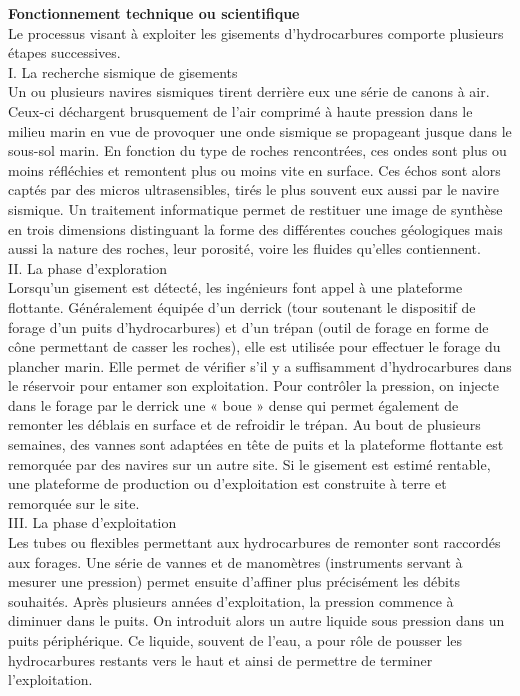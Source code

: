 \documentclass[8pt]{article}
\begin{document}
\textbf{Fonctionnement technique ou scientifique}\\

Le processus visant à exploiter les gisements d’hydrocarbures comporte plusieurs étapes successives.\\

I. La recherche sismique de gisements\\

Un ou plusieurs navires sismiques tirent derrière eux une série de canons à air. Ceux-ci déchargent brusquement de l’air comprimé à haute pression dans le milieu marin en vue de provoquer une onde sismique se propageant jusque dans le sous-sol marin. En fonction du type de roches rencontrées, ces ondes sont plus ou moins réfléchies et remontent plus ou moins vite en surface. Ces échos sont alors captés par des micros ultrasensibles, tirés le plus souvent eux aussi par le navire sismique. Un traitement informatique permet de restituer une image de synthèse en trois dimensions distinguant la forme des différentes couches géologiques mais aussi la nature des roches, leur porosité, voire les fluides qu’elles contiennent.\\

II. La phase d’exploration\\

Lorsqu’un gisement est détecté, les ingénieurs font appel à une plateforme flottante. Généralement équipée d’un derrick (tour soutenant le dispositif de forage d'un puits d’hydrocarbures) et d’un trépan (outil de forage en forme de cône permettant de casser les roches), elle est utilisée pour effectuer le forage du plancher marin. Elle permet de vérifier s’il y a suffisamment d’hydrocarbures dans le réservoir pour entamer son exploitation. Pour contrôler la pression, on injecte dans le forage par le derrick une « boue » dense qui permet également de remonter les déblais en surface et de refroidir le trépan. Au bout de plusieurs semaines, des vannes sont adaptées en tête de puits et la plateforme flottante est remorquée par des navires sur un autre site. Si le gisement est estimé rentable, une plateforme de production ou d’exploitation est construite à terre et remorquée sur le site.\\

III. La phase d’exploitation\\

Les tubes ou flexibles permettant aux hydrocarbures de remonter sont raccordés aux forages. Une série de vannes et de manomètres (instruments servant à mesurer une pression) permet ensuite d’affiner plus précisément les débits souhaités. Après plusieurs années d’exploitation, la pression commence à diminuer dans le puits. On introduit alors un autre liquide sous pression dans un puits périphérique. Ce liquide, souvent de l’eau, a pour rôle de pousser les hydrocarbures restants vers le haut et ainsi de permettre de terminer l’exploitation.\\
\end{document}
